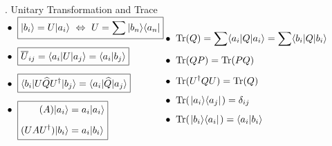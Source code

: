 \documentclass[12pt]{article}
\newcommand{\hs}{\hspace{1pt}} %
\begin{document}
\vspace{30pt}. Unitary Transformation and Trace\\[10pt]
\(
    \begin{aligned}
        & \bullet\ \boxed{ | b_i \rangle = U | a_i \rangle
            \ \Leftrightarrow\ U = \sum | b_n \rangle \langle a_n | }
            \\[5pt]
        & \bullet\ \boxed{ \overline{U}_{ij} = \langle a_i | U | a_j \rangle 
            = \langle a_i | b_j \rangle }
            \\[5pt]
        & \bullet\ \boxed{ \langle b_i | U \widehat{Q} U^\dagger | b_j \rangle 
            = \langle a_i | \widehat{Q} | a_j \rangle }
            \\[5pt]
        & \bullet\ \boxed{ \begin{aligned}[t]
                (A) | a_i \rangle & = a_i | a_i \rangle \\[5pt]
                (U A U^\dagger) | b_i \rangle & = a_i | b_i \rangle 
            \end{aligned}
            }
    \end{aligned}
    \hfill
    \begin{aligned}
        & \bullet\ { \text{Tr}(Q) = \sum \langle a_i | Q | a_i \rangle 
            = \sum \langle b_i | Q | b_i \rangle }
            \\[5pt]
        & \bullet\ { \text{Tr}(QP) = \text{Tr}(PQ)} \\[5pt]
        & \bullet\ { \text{Tr}(U^\dagger Q U) = \text{Tr}(Q)} \\[5pt]
        & \bullet\ { \text{Tr}( \hs | a_i \rangle \langle a_j | \hs ) = \delta_{ij} } \\[5pt]
        & \bullet\ { \text{Tr}( \hs | b_i \rangle \langle a_i | \hs ) = \langle a_i | b_i \rangle }
    \end{aligned}
    \hfill\hs
\)
\end{document}
